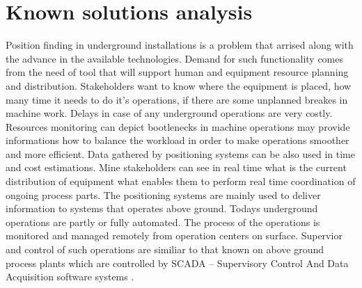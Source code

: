 \documentclass[../main.tex]{subfiles}
\begin{document}
\section{Known solutions analysis}

Position finding in underground installations is a problem that arrised along with the advance in the available technologies. Demand for such functionality comes from the need of tool that will support human and equipment resource planning and distribution. Stakeholders want to know where the equipment is placed, how many time it needs to do it's operations, if there are some unplanned breakes in machine work. Delays in case of any underground operations are very costly. Resources monitoring can depict bootlenecks in machine operations may provide informations how to balance the workload in order to make operations smoother and more efficient. Data gathered by positioning systems can be also used in time and cost estimations. Mine stakeholders can see in real time what is the current distribution of equipment what enables them to perform real time coordination of ongoing process parts. The positioning systems are mainly used to deliver information to systems that operates above ground. Todays underground operations are partly or fully automated. The process of the operations is monitored and managed remotely from operation centers on surface. Supervior and control of such operations are similiar to that known on above ground process plants which are controlled by SCADA -- Supervisory Control And Data Acquisition software systems \cite{Thesis_CM}.
\end{document}
